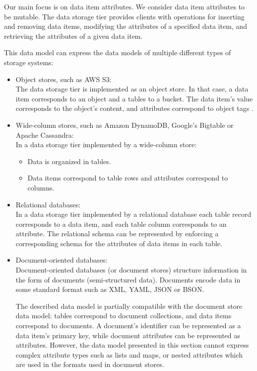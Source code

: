 Our main focus is on data item attributes.
We consider data item attributes to be mutable.
The data storage tier provides clients with operations for inserting and removing data items,
modifying the attributes of a specified data item, and retrieving the attributes of a given data item.

\medskip
\noindent
This data model can express the data models of multiple different types of storage systems:
\begin{itemize}
  \item Object stores, such as AWS S3: \\
  The data storage tier is implemented as an object store.
  In that case, a data item corresponds to an object and a tables to a bucket.
  The data item's value corresponds to the object's content,
  and attributes correspond to object tags \cite{awss3:tagging}.

  \item Wide-column stores, such as Amazon DynamoDB, Google's Bigtable or Apache Cassandra: \\
  In a data storage tier implemented by a wide-column store:
  \begin{itemize}
    \item Data is organized in tables.
    \item Data items correspond to table rows and attributes correspond to columns.
  \end{itemize}

  \item Relational databases: \\
  In a data storage tier implemented by a relational database each table record corresponds to a data item, and each
  table column corresponds to an attribute.
  The relational schema can be represented by enforcing a corresponding schema for the attributes of data items in each
  table.

  \item Document-oriented databases: \\
  Document-oriented databases (or document stores) structure information in the form of documents (semi-structured data).
  Documents encode data in some standard format such as XML, YAML, JSON or BSON.

  The described data model is partially compatible with the document store data model:
  tables correspond to document collections, and data items correspond to documents.
  A document's identifier can be represented as a data item's primary key, while document attributes can be represented
  as attributes.
  However, the data model presented in this section cannot express complex attribute types such as lists and maps,
  or nested attributes which are used in the formats used in document stores.


\end{itemize}
